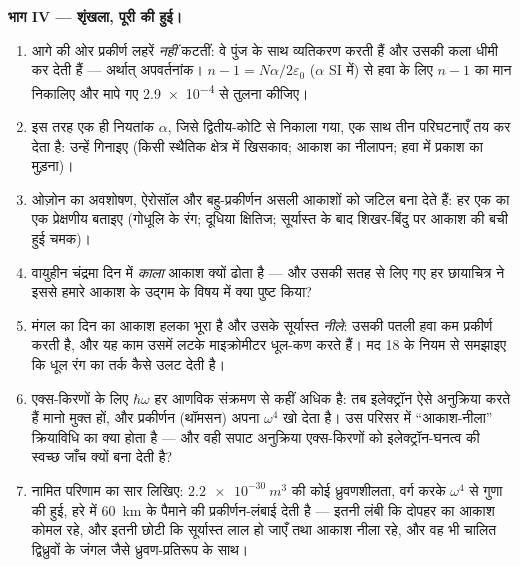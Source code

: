 \begin{problem}
\medskip\noindent\textbf{भाग IV --- शृंखला, पूरी की हुई।}
\begin{enumerate}[resume]
  \item आगे की ओर प्रकीर्ण लहरें \emph{नहीं} कटतीं: वे पुंज के साथ
        व्यतिकरण करती हैं और उसकी कला धीमी कर देती हैं --- अर्थात्
        अपवर्तनांक। $n - 1 = N\alpha/2\varepsilon_0$
        ($\alpha$ SI में) से हवा के लिए $n - 1$ का मान निकालिए और
        मापे गए \num{2.9e-4} से तुलना कीजिए।
  \item इस तरह एक ही नियतांक $\alpha$, जिसे द्वितीय-कोटि
         से निकाला गया, एक साथ तीन परिघटनाएँ तय कर
        देता है: उन्हें गिनाइए (किसी स्थैतिक क्षेत्र में खिसकाव;
        आकाश का नीलापन; हवा में प्रकाश का मुड़ना)।
  \item ओज़ोन का अवशोषण, ऐरोसॉल और बहु-प्रकीर्णन असली आकाशों को
        जटिल बना देते हैं: हर एक का एक प्रेक्षणीय बताइए
        (गोधूलि के रंग; दूधिया क्षितिज; सूर्यास्त के बाद शिखर-बिंदु
        पर आकाश की बची हुई चमक)।
  \item वायुहीन चंद्रमा दिन में \emph{काला} आकाश क्यों ढोता है ---
        और उसकी सतह से लिए गए हर छायाचित्र ने इससे हमारे आकाश के
        उद्गम के विषय में क्या पुष्ट किया?
  \item मंगल का दिन का आकाश हलका भूरा है और उसके सूर्यास्त
        \emph{नीले}: उसकी पतली हवा कम प्रकीर्ण करती है, और यह काम
        उसमें लटके माइक्रोमीटर धूल-कण करते हैं। मद 18 के नियम से
        समझाइए कि धूल रंग का तर्क कैसे उलट देती है।
  \item एक्स-किरणों के लिए $\hbar\omega$ हर आणविक संक्रमण से कहीं
        अधिक है: तब इलेक्ट्रॉन ऐसे अनुक्रिया करते हैं मानो मुक्त हों,
        और प्रकीर्णन (थॉमसन) अपना $\omega^4$ खो देता है। उस परिसर
        में ``आकाश-नीला'' क्रियाविधि का क्या होता है --- और वही सपाट
        अनुक्रिया एक्स-किरणों को इलेक्ट्रॉन-घनत्व की स्वच्छ जाँच
        क्यों बना देती है?
  \item नामित परिणाम का सार लिखिए: $\qty{2.2e-30}{m^3}$ की कोई
        ध्रुवणशीलता, वर्ग करके $\omega^4$ से गुणा की हुई,
        हरे में \qty{60}{km} के पैमाने की प्रकीर्णन-लंबाई देती है
        --- इतनी लंबी कि दोपहर का आकाश कोमल रहे, और इतनी छोटी कि
        सूर्यास्त लाल हो जाएँ तथा आकाश नीला रहे, और वह भी चालित
        द्विध्रुवों के जंगल जैसे ध्रुवण-प्रतिरूप के साथ।
\end{enumerate}
\end{problem}
